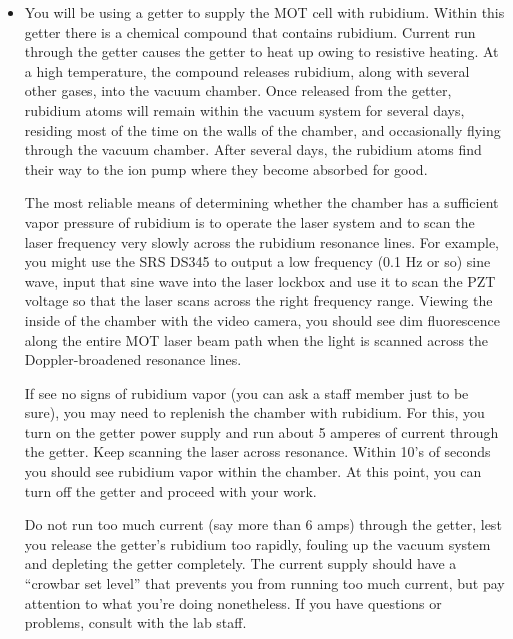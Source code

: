 \documentclass{../lab}
\begin{document}
\begin{itemize}
    \item You will be using a getter to supply the MOT cell with rubidium.  Within this getter there is a chemical compound that contains rubidium.  Current run through the getter causes the getter to heat up owing to resistive heating.  At a high temperature, the compound releases rubidium, along with several other gases, into the vacuum chamber.  Once released from the getter, rubidium atoms will remain within the vacuum system for several days, residing most of the time on the walls of the chamber, and occasionally flying through the vacuum chamber.  After several days, the rubidium atoms find their way to the ion pump where they become absorbed for good.
    
    The most reliable means of determining whether the chamber has a sufficient vapor pressure of rubidium is to operate the laser system and to scan the laser frequency very slowly across the rubidium resonance lines.  For example, you might use the SRS DS345 to output a low frequency (0.1 Hz or so) sine wave, input that sine wave into the laser lockbox and use it to scan the PZT voltage so that the laser scans across the right frequency range. Viewing the inside of the chamber with the video camera, you should see dim fluorescence along the entire MOT laser beam path when the light is scanned across the Doppler-broadened resonance lines.
    
    If see no signs of rubidium vapor (you can ask a staff member just to be sure), you may need to replenish the chamber with rubidium.  For this, you turn on the getter power supply and run about 5 amperes of current through the getter.  Keep scanning the laser across resonance.  Within 10's of seconds you should see rubidium vapor within the chamber.  At this point, you can turn off the getter and proceed with your work.
    
    Do not run too much current (say more than 6 amps) through the getter, lest you release the getter's rubidium too rapidly, fouling up the vacuum system and depleting the getter completely.  The current supply should have a ``crowbar set level'' that prevents you from running too much current, but pay attention to what you're doing nonetheless.  If you have questions or problems, consult with the lab staff.
    

\end{itemize}
\end{document}
